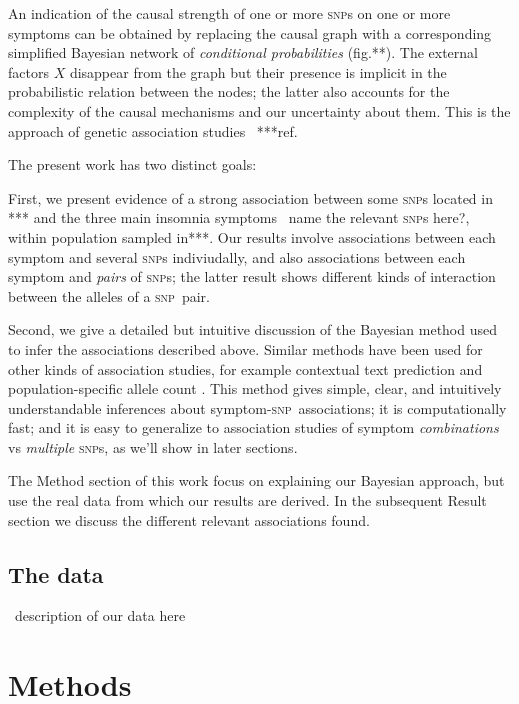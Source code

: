 \documentclass[\ifafour a4paper,12pt,\else a5paper,10pt,\fi%
onecolumn,oneside,article,%
british%
]{memoir}
\theoremstyle{remark}
\theoremstyle{innote}
\newcommand*{\citep}{\parencites}
\renewcommand*{\|}{\mathpunct{|}}
\newcommand*{\fig}{fig.}%
\newcommand*{\puzzle}{\maltese}
\newcommand{\mynote}[1]{ {\color{notecolour}\puzzle\ #1}}
\newcommand*{\snp}{\textsc{snp}}
\begin{document}
An indication of the causal strength of one or more \snp s on one or more
symptoms can be obtained by replacing the causal graph with a corresponding
simplified Bayesian network \citep{pearl2000_r2009} of \emph{conditional
  probabilities} (\fig**). The external factors $X$ disappear from the
graph but their presence is implicit in the probabilistic relation between
the nodes; the latter also accounts for the complexity of the causal
mechanisms and our uncertainty about them. This is the approach of genetic
association studies \mynote{***ref}.

The present work has two distinct goals:

First, we present evidence of a strong association between some \snp s
located in *** and the three main insomnia symptoms \mynote{name the
  relevant \snp s here?}, within population sampled in***. Our results involve
associations between each symptom and several \snp s indiviudally, and also
associations between each symptom and \emph{pairs} of \snp s; the latter
result shows different kinds of interaction between the alleles of a \snp\
pair.

Second, we give a detailed but intuitive discussion of the Bayesian method
used to infer the associations described above. Similar methods have been
used for other kinds of association studies, for example contextual text
prediction \citep{mackayetal1995} and population-specific allele count
\citep{lockwoodetal2001}. This method gives simple, clear, and intuitively
understandable inferences about symptom-\snp\ associations; it is
computationally fast; and it is easy to generalize to association studies
of symptom \emph{combinations} vs \emph{multiple} \snp s, as we'll show in
later sections.

The Method section of this work focus on explaining our Bayesian approach,
but use the real data from which our results are derived. In the subsequent
Result section we discuss the different relevant associations found.


\subsection{The data}
\label{sec:data}

\mynote{description of our data here}

\section{Methods}
\label{sec:methods}
\end{document}
